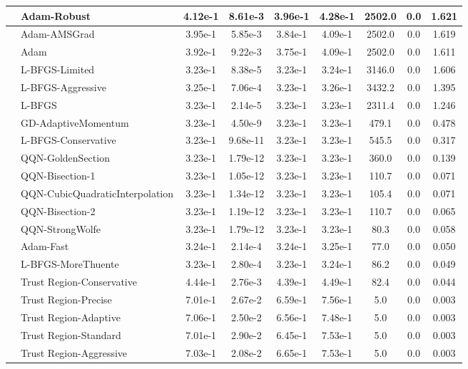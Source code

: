 \documentclass{article}
\begin{document}
\begin{longtable}{|l|l|c|c|c|c|c|c|c|}
\hline
 & Adam-Robust & 4.12e-1 & 8.61e-3 & 3.96e-1 & 4.28e-1 & 2502.0 & 0.0 & 1.621 \\
\hline
 & Adam-AMSGrad & 3.95e-1 & 5.85e-3 & 3.84e-1 & 4.09e-1 & 2502.0 & 0.0 & 1.619 \\
\hline
 & Adam & 3.92e-1 & 9.22e-3 & 3.75e-1 & 4.09e-1 & 2502.0 & 0.0 & 1.611 \\
\hline
 & L-BFGS-Limited & 3.23e-1 & 8.38e-5 & 3.23e-1 & 3.24e-1 & 3146.0 & 0.0 & 1.606 \\
\hline
 & L-BFGS-Aggressive & 3.25e-1 & 7.06e-4 & 3.23e-1 & 3.26e-1 & 3432.2 & 0.0 & 1.395 \\
\hline
 & L-BFGS & 3.23e-1 & 2.14e-5 & 3.23e-1 & 3.23e-1 & 2311.4 & 0.0 & 1.246 \\
\hline
 & GD-AdaptiveMomentum & 3.23e-1 & 4.50e-9 & 3.23e-1 & 3.23e-1 & 479.1 & 0.0 & 0.478 \\
\hline
 & L-BFGS-Conservative & 3.23e-1 & 9.68e-11 & 3.23e-1 & 3.23e-1 & 545.5 & 0.0 & 0.317 \\
\hline
 & QQN-GoldenSection & 3.23e-1 & 1.79e-12 & 3.23e-1 & 3.23e-1 & 360.0 & 0.0 & 0.139 \\
\hline
 & QQN-Bisection-1 & 3.23e-1 & 1.05e-12 & 3.23e-1 & 3.23e-1 & 110.7 & 0.0 & 0.071 \\
\hline
 & QQN-CubicQuadraticInterpolation & 3.23e-1 & 1.34e-12 & 3.23e-1 & 3.23e-1 & 105.4 & 0.0 & 0.071 \\
\hline
 & QQN-Bisection-2 & 3.23e-1 & 1.19e-12 & 3.23e-1 & 3.23e-1 & 110.7 & 0.0 & 0.065 \\
\hline
 & QQN-StrongWolfe & 3.23e-1 & 1.79e-12 & 3.23e-1 & 3.23e-1 & 80.3 & 0.0 & 0.058 \\
\hline
 & Adam-Fast & 3.24e-1 & 2.14e-4 & 3.24e-1 & 3.25e-1 & 77.0 & 0.0 & 0.050 \\
\hline
 & L-BFGS-MoreThuente & 3.23e-1 & 2.80e-4 & 3.23e-1 & 3.24e-1 & 86.2 & 0.0 & 0.049 \\
\hline
 & Trust Region-Conservative & 4.44e-1 & 2.76e-3 & 4.39e-1 & 4.49e-1 & 82.4 & 0.0 & 0.044 \\
\hline
 & Trust Region-Precise & 7.01e-1 & 2.67e-2 & 6.59e-1 & 7.56e-1 & 5.0 & 0.0 & 0.003 \\
\hline
 & Trust Region-Adaptive & 7.06e-1 & 2.50e-2 & 6.56e-1 & 7.48e-1 & 5.0 & 0.0 & 0.003 \\
\hline
 & Trust Region-Standard & 7.01e-1 & 2.90e-2 & 6.45e-1 & 7.53e-1 & 5.0 & 0.0 & 0.003 \\
\hline
 & Trust Region-Aggressive & 7.03e-1 & 2.08e-2 & 6.65e-1 & 7.53e-1 & 5.0 & 0.0 & 0.003 \\

\end{longtable}
\end{document}
